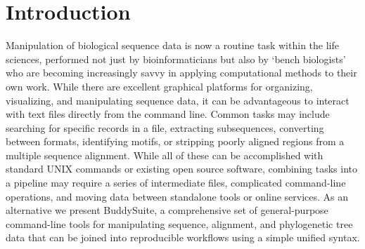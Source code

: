 \documentclass[nogrid]{MBE_article}%
\begin{document}
\section{{Introduction}\label{sec:Intro}}
Manipulation of biological sequence data is now a routine task within the life sciences, performed not just by bioinformaticians but also by `bench biologists' who are becoming increasingly savvy in applying computational methods to their own work. While there are excellent graphical platforms for organizing, visualizing, and manipulating sequence data, it can be advantageous to interact with text files directly from the command line. Common tasks may include searching for specific records in a file, extracting subsequences, converting between formats, identifying motifs, or stripping poorly aligned regions from a multiple sequence alignment. While all of these can be accomplished with standard UNIX commands or existing open source software, combining tasks into a pipeline may require a series of intermediate files, complicated command-line operations, and moving data between standalone tools or online services. As an alternative we present BuddySuite, a comprehensive set of general-purpose command-line tools for manipulating sequence, alignment, and phylogenetic tree data that can be joined into reproducible workflows using a simple unified syntax.
\end{document}
